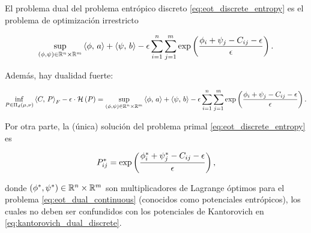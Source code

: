 \begin{prop}
	\label{prop:eot_dual_discrete}
	El problema dual del problema entrópico discreto \eqref{eq:eot_discrete_entropy} es el problema de optimización irrestricto

	\begin{equation}
		\label{eq:eot_dual_discrete}
		\sup_{(\phi,\psi)\in\mathbb{R}^n\times\mathbb{R}^m}
		\left\langle \phi,\,a\right\rangle + \left\langle \psi,\,b\right\rangle
		-\epsilon \sum_{i=1}^n\sum_{j=1}^m \exp\left(\frac{\phi_i + \psi_j-C_{ij} - \epsilon}{\epsilon}\right).
	\end{equation}

	Además, hay dualidad fuerte:

	\begin{equation*}
		\inf_{P\in\Pi_d(\mu,\nu)} \left\langle C,\,P\right\rangle_F - \epsilon\cdot\mathcal{H}\left(P\right)
		= \sup_{(\phi,\psi)\in\mathbb{R}^n\times\mathbb{R}^m}
		\left\langle \phi,\,a\right\rangle + \left\langle \psi,\,b\right\rangle
		-\epsilon \sum_{i=1}^n\sum_{j=1}^m \exp\left(\frac{\phi_i + \psi_j-C_{ij} - \epsilon}{\epsilon}\right).
	\end{equation*}

	Por otra parte, la (única) solución del problema primal \eqref{eq:eot_discrete_entropy} es

	\begin{equation*}
		P_{ij}^* = \exp\left(\frac{\phi_i^* + \psi_j^* - C_{ij} - \epsilon}{\epsilon}\right),
	\end{equation*}

	donde $(\phi^*,\psi^*)\in\mathbb{R}^n\times\mathbb{R}^m$ son multiplicadores de Lagrange óptimos para el problema \eqref{eq:eot_dual_continuous} (conocidos como potenciales entrópicos), los cuales no deben ser confundidos con los potenciales de Kantorovich en \eqref{eq:kantorovich_dual_discrete}.
\end{prop}

\vspace{-1cm}

